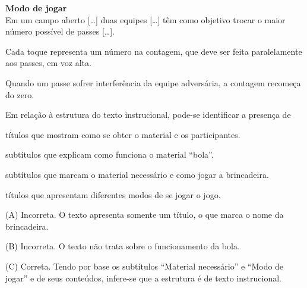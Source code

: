 \begin{escolha}
\begin{escolha}
\textbf{Modo de jogar}\\
Em um campo aberto {[}\ldots{}{]} duas equipes {[}\ldots{}{]} têm como
objetivo trocar o maior número possível de passes {[}\ldots{}{]}.

Cada toque representa um número na contagem, que deve ser feita
paralelamente aos passes, em voz alta.

Quando um passe sofrer interferência da equipe adversária, a contagem
recomeça do zero.


Em relação à estrutura do texto instrucional, pode-se identificar a
presença de

\begin{escolha}
\item títulos que mostram como se obter o material e os participantes.

\item subtítulos que explicam como funciona o material ``bola''.

\item subtítulos que marcam o material necessário e como jogar a brincadeira.

\item títulos que apresentam diferentes modos de se jogar o jogo.
\end{escolha}


(A) Incorreta. O texto apresenta somente um título, o que marca o nome
da brincadeira.

(B) Incorreta. O texto não trata sobre o funcionamento da bola.

(C) Correta. Tendo por base os subtítulos ``Material necessário'' e
``Modo de jogar'' e de seus conteúdos, infere-se que a estrutura é de
texto instrucional.


\end{escolha}
\end{escolha}
